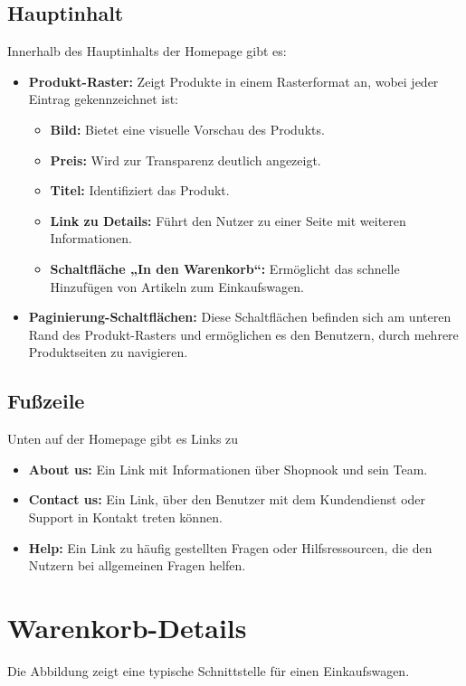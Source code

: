  \subsection{Hauptinhalt}
Innerhalb des Hauptinhalts der Homepage gibt es:
\begin{itemize}
	\item \textbf{Produkt-Raster:} Zeigt Produkte in einem Rasterformat an, wobei jeder Eintrag gekennzeichnet ist:
	\begin{itemize}
		\item \textbf{Bild:} Bietet eine visuelle Vorschau des Produkts.
		\item \textbf{Preis:} Wird zur Transparenz deutlich angezeigt.
		\item \textbf{Titel:} Identifiziert das Produkt.
		\item \textbf{Link zu Details:} Führt den Nutzer zu einer Seite mit weiteren Informationen.
		\item \textbf{Schaltfläche „In den Warenkorb“:} Ermöglicht das schnelle Hinzufügen von Artikeln zum Einkaufswagen.
	\end{itemize}
	\item \textbf{Paginierung-Schaltflächen:} Diese Schaltflächen befinden sich am unteren Rand des Produkt-Rasters und ermöglichen es den Benutzern, durch mehrere Produktseiten zu navigieren.
\end{itemize}


 \subsection{Fußzeile}

Unten auf der Homepage gibt es Links zu
\begin{itemize}
	\item \textbf{About us:} Ein Link mit Informationen über Shopnook und sein Team.
	\item \textbf{Contact us:} Ein Link, über den Benutzer mit dem Kundendienst oder Support in Kontakt treten können.
	\item \textbf{Help:} Ein Link zu häufig gestellten Fragen oder Hilfsressourcen, die den Nutzern bei allgemeinen Fragen helfen.
\end{itemize}


\section{Warenkorb-Details}

Die Abbildung zeigt eine typische Schnittstelle für einen Einkaufswagen.

